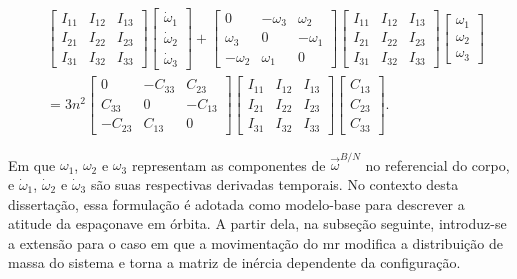 \begin{equation}
\begin{split}
&
\begin{bmatrix}
I_{11} & I_{12} & I_{13}\\
I_{21} & I_{22} & I_{23}\\
I_{31} & I_{32} & I_{33}
\end{bmatrix}
\begin{bmatrix}
\dot{\omega}_1\\
\dot{\omega}_2\\
\dot{\omega}_3
\end{bmatrix}
+
\begin{bmatrix}
0 & -\omega_3 & \omega_2\\
\omega_3 & 0 & -\omega_1\\
-\omega_2 & \omega_1 & 0
\end{bmatrix}
\begin{bmatrix}
I_{11} & I_{12} & I_{13}\\
I_{21} & I_{22} & I_{23}\\
I_{31} & I_{32} & I_{33}
\end{bmatrix}
\begin{bmatrix}
\omega_1\\
\omega_2\\
\omega_3
\end{bmatrix}
\\[1ex]
&=
3n^2
\begin{bmatrix}
0 & -C_{33} & C_{23}\\
C_{33} & 0 & -C_{13}\\
-C_{23} & C_{13} & 0
\end{bmatrix}
\begin{bmatrix}
I_{11} & I_{12} & I_{13}\\
I_{21} & I_{22} & I_{23}\\
I_{31} & I_{32} & I_{33}
\end{bmatrix}
\begin{bmatrix}
C_{13}\\
C_{23}\\
C_{33}
\end{bmatrix}.
\end{split}
\label{eq_euler_gg_expandida}
\end{equation}

Em que $\omega_1$, $\omega_2$ e $\omega_3$ representam as componentes de $\vec{\omega}^{B/N}$ no referencial do corpo, e $\dot{\omega}_1$, $\dot{\omega}_2$ e $\dot{\omega}_3$ são suas respectivas derivadas temporais.
No contexto desta dissertação, essa formulação é adotada como modelo-base para descrever a atitude da espaçonave em órbita. A partir dela, na subseção seguinte, introduz-se a extensão para o caso em que a movimentação do \gls{mr} modifica a distribuição de massa do sistema e torna a matriz de inércia dependente da configuração.

